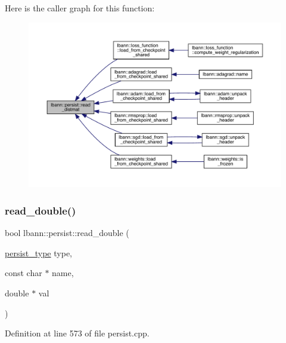 Here is the caller graph for this function\+:\nopagebreak
\begin{figure}[H]
\begin{center}
\leavevmode
\includegraphics[width=350pt]{classlbann_1_1persist_aa98be93f33b510e5b506b61de6bd79bd_icgraph}
\end{center}
\end{figure}
\mbox{\label{classlbann_1_1persist_ae3a0b96ece72901bb0a05d26a4eb4791}} 
\subsubsection{\texorpdfstring{read\+\_\+double()}{read\_double()}}
{\footnotesize\ttfamily bool lbann\+::persist\+::read\+\_\+double (\begin{DoxyParamCaption}\item[{\hyperlink{namespacelbann_adee41f31f15f3906cbdcce4a1417eb56}{persist\+\_\+type}}]{type,  }\item[{const char $\ast$}]{name,  }\item[{double $\ast$}]{val }\end{DoxyParamCaption})}



Definition at line 573 of file persist.\+cpp.


